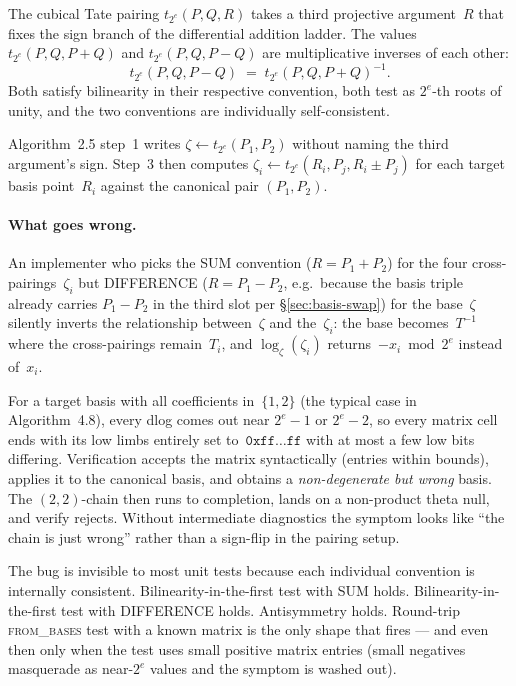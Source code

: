 \documentclass[a4paper,11pt]{article}
\newcommand{\algo}[1]{Algorithm~#1}
\begin{document}
The cubical Tate pairing $t_{2^e}(P, Q, R)$ takes a third
projective argument~$R$ that fixes the sign branch of the
differential addition ladder.  The values
$t_{2^e}(P, Q, P{+}Q)$ and $t_{2^e}(P, Q, P{-}Q)$ are
multiplicative inverses of each other:
\[
  t_{2^e}(P, Q, P{-}Q) \;=\; t_{2^e}(P, Q, P{+}Q)^{-1}.
\]
Both satisfy bilinearity in their respective convention, both
test as $2^e$-th roots of unity, and the two conventions are
individually self-consistent.

\algo{2.5} step~1 writes $\zeta \leftarrow t_{2^e}(P_1, P_2)$
without naming the third argument's sign.  Step~3 then computes
$\zeta_i \leftarrow t_{2^e}(R_i, P_j, R_i \pm P_j)$ for each
target basis point~$R_i$ against the canonical pair $(P_1, P_2)$.

\paragraph{What goes wrong.}
An implementer who picks the SUM convention
($R = P_1 {+} P_2$) for the four cross-pairings~$\zeta_i$ but
DIFFERENCE
($R = P_1 {-} P_2$, e.g.\ because the basis triple already
carries $P_1 {-} P_2$ in the third slot per
\S\ref{sec:basis-swap}) for the base~$\zeta$ silently inverts
the relationship between~$\zeta$ and the~$\zeta_i$: the base
becomes~$T^{-1}$ where the cross-pairings remain~$T_i$, and
$\log_\zeta(\zeta_i)$ returns~$-x_i \bmod 2^e$ instead of~$x_i$.

For a target basis with all coefficients in~$\{1, 2\}$ (the
typical case in \algo{4.8}), every dlog comes out near
$2^e - 1$ or $2^e - 2$, so every matrix cell ends with its low
limbs entirely set to~$\mathtt{0xff\ldots ff}$ with at most a
few low bits differing.  Verification accepts the matrix
syntactically (entries within bounds), applies it to the
canonical basis, and obtains a \emph{non-degenerate but wrong}
basis.  The $(2,2)$-chain then runs to completion, lands on a
non-product theta null, and verify rejects.  Without
intermediate diagnostics the symptom looks like ``the chain is
just wrong'' rather than a sign-flip in the pairing setup.

The bug is invisible to most unit tests because each individual
convention is internally consistent.  Bilinearity-in-the-first
test with SUM holds.  Bilinearity-in-the-first test with
DIFFERENCE holds.  Antisymmetry holds.  Round-trip
\textsc{from\_bases} test with a known matrix is the only
shape that fires --- and even then only when the test uses
small positive matrix entries (small negatives masquerade as
near-$2^e$ values and the symptom is washed out).
\end{document}
